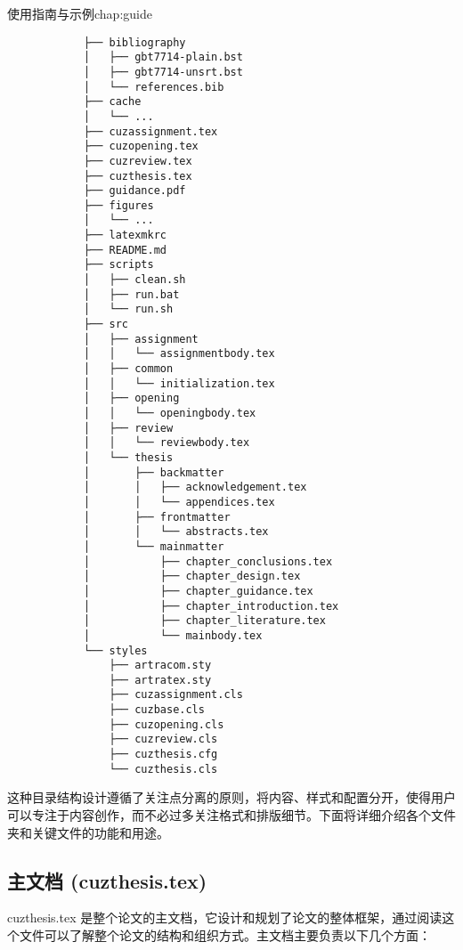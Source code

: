 \begin{cuzchapter}{使用指南与示例}{chap:guide}
    \begingroup
    \small\linespread{1}
    \begin{center}
        \begin{verbatim}
            ├── bibliography
            │   ├── gbt7714-plain.bst
            │   ├── gbt7714-unsrt.bst
            │   └── references.bib
            ├── cache
            │   └── ...
            ├── cuzassignment.tex
            ├── cuzopening.tex
            ├── cuzreview.tex
            ├── cuzthesis.tex
            ├── guidance.pdf
            ├── figures
            │   └── ...
            ├── latexmkrc
            ├── README.md
            ├── scripts
            │   ├── clean.sh
            │   ├── run.bat
            │   └── run.sh
            ├── src
            │   ├── assignment
            │   │   └── assignmentbody.tex
            │   ├── common
            │   │   └── initialization.tex
            │   ├── opening
            │   │   └── openingbody.tex
            │   ├── review
            │   │   └── reviewbody.tex
            │   └── thesis
            │       ├── backmatter
            │       │   ├── acknowledgement.tex
            │       │   └── appendices.tex
            │       ├── frontmatter
            │       │   └── abstracts.tex
            │       └── mainmatter
            │           ├── chapter_conclusions.tex
            │           ├── chapter_design.tex
            │           ├── chapter_guidance.tex
            │           ├── chapter_introduction.tex
            │           ├── chapter_literature.tex
            │           └── mainbody.tex
            └── styles
                ├── artracom.sty
                ├── artratex.sty
                ├── cuzassignment.cls
                ├── cuzbase.cls
                ├── cuzopening.cls
                ├── cuzreview.cls
                ├── cuzthesis.cfg
                └── cuzthesis.cls
        \end{verbatim}
    \end{center}
    \endgroup

    这种目录结构设计遵循了关注点分离的原则，将内容、样式和配置分开，使得用户可以专注于内容创作，而不必过多关注格式和排版细节。下面将详细介绍各个文件夹和关键文件的功能和用途。

    \subsection{主文档 (cuzthesis.tex)}\label{sub:cuzthesis}

    cuzthesis.tex 是整个论文的主文档，它设计和规划了论文的整体框架，通过阅读这个文件可以了解整个论文的结构和组织方式。主文档主要负责以下几个方面：


\end{cuzchapter}
